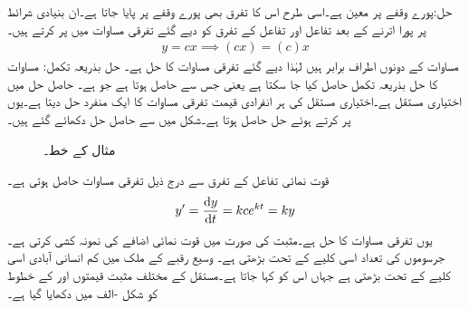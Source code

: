 حل:پورے وقفے پر  معین ہے۔اسی طرح اس کا تفرق  بھی پورے وقفے پر پایا جاتا ہے۔ان بنیادی شرائط پر پورا اترنے کے بعد تفاعل اور تفاعل کے تفرق کو دیے گئے تفرقی مساوات میں پر کرتے ہیں۔
\begin{align*}
y=cx \implies (cx)=(c)x
\end{align*}
مساوات کے دونوں اطراف برابر ہیں لہٰذا  دیے گئے تفرقی مساوات کا حل ہے۔
حل بذریعہ تکمل: مساوات  کا حل بذریعہ تکمل حاصل کیا جا سکتا ہے یعنی  جس سے  حاصل ہوتا ہے جو  ہے۔ حاصل حل میں  اختیاری مستقل ہے۔اختیاری مستقل کی ہر انفرادی قیمت تفرقی مساوات کا ایک منفرد حل دیتا ہے۔یوں  پر کرتے ہوئے  حل حاصل ہوتا ہے۔شکل  میں  سے حاصل حل دکھائے گئے ہیں۔
\begin{figure}
\centering
{}
\caption{مثال  کے خط۔}
\label{شکل_مثال_تفرقی_اول_حل_نسل_الف}
\end{figure}
قوت نمائی تفاعل  کے تفرق سے درج ذیل تفرقی مساوات حاصل ہوتی ہے۔
\begin{align*}
y'=\frac{\dif y}{\dif t}=k ce^{kt}=ky
\end{align*}
یوں  تفرقی مساوات کا حل  ہے۔مثبت  کی صورت میں  قوت نمائی اضافے کی نمونہ کشی کرتی ہے۔جرسوموں کی تعداد اسی کلیے کے تحت بڑھتی ہے۔ وسیع رقبے کے ملک میں کم انسانی آبادی اسی کلیے کے تحت بڑھتی ہے جہاں اس کو  کہا جاتا ہے۔مستقل  کے مختلف مثبت قیمتوں اور  کے خطوط کو شکل -الف میں دکھایا گیا ہے۔ 

